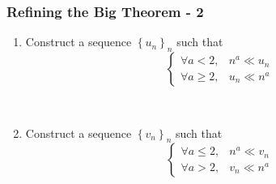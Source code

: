\documentclass[14pt]{beamer}
\newcommand{\seqs}[1]{\left\{ #1_n \right\}_{n}}
\begin{document}
	\begin{frame}[t]
		\frametitle{Refining the Big Theorem - 2}

		\begin{enumerate}
			\item Construct a sequence ${\displaystyle \seqs{u}}$ such that
				\[
					\begin{cases}
						\forall a < 2,    & n^{a} \ll u_{n} \\
						\forall a \geq 2, & u_{n} \ll n^{a}
					\end{cases}
				\]

				\


			\item Construct a sequence ${\displaystyle \seqs{v}}$ such that
				\[
					\begin{cases}
						\forall a \leq 2, & n^{a} \ll v_{n} \\
						\forall a > 2,    & v_{n} \ll n^{a}
					\end{cases}
				\]
		\end{enumerate}
	\end{frame}
\end{document}
